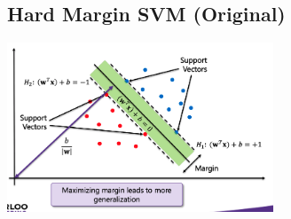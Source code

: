 \documentclass{tron}
\begin{document}
\subsection{Hard Margin SVM (Original)}
\begin{definition}{}
	\includegraphics[width=300px]{Figs/slide8/svm-hard}
	

\end{definition}
\end{document}
